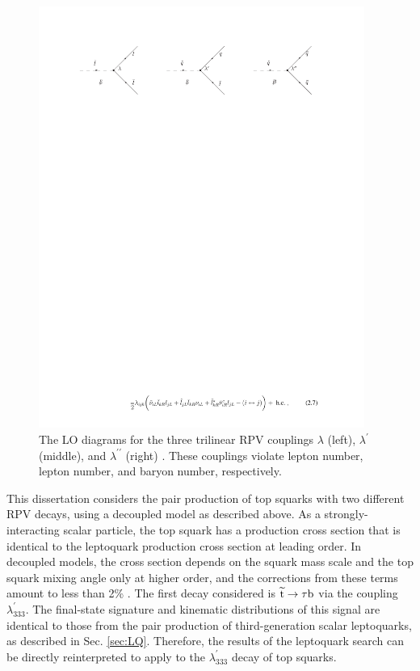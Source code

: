 \begin{figure}[hbt]
\begin{center}
\includegraphics[width=0.95\textwidth]{figures/0406039v2_trilinear.pdf}
\caption{The LO diagrams for the three trilinear RPV couplings $\lambda$ (left), $\lambda^{\prime}$ (middle), and $\lambda^{\prime \prime}$ (right) \cite{Barbier}. These couplings violate lepton number, lepton number, and baryon number, respectively.}
\label{fig:trilinear-RPV}
\end{center}
\end{figure}

This dissertation considers the pair production of top squarks with two different RPV decays, using a decoupled model as described above. As a strongly-interacting scalar particle, the top squark has a production cross section that is identical to the leptoquark production cross section at leading order. In decoupled models, the cross section depends on the squark mass scale and the top squark mixing angle only at higher order, and the corrections from these terms amount to less than 2\% \cite{StopCrossSec}. The first decay considered is $\widetilde{\mathrm{t}} \rightarrow \tau \mathrm{b}$ via the coupling $\lambda_{333}^{\prime}$. The final-state signature and kinematic distributions of this signal are identical to those from the pair production of third-generation scalar leptoquarks, as described in Sec. \ref{sec:LQ}. Therefore, the results of the leptoquark search can be directly reinterpreted to apply to the $\lambda_{333}^{\prime}$ decay of top squarks.

